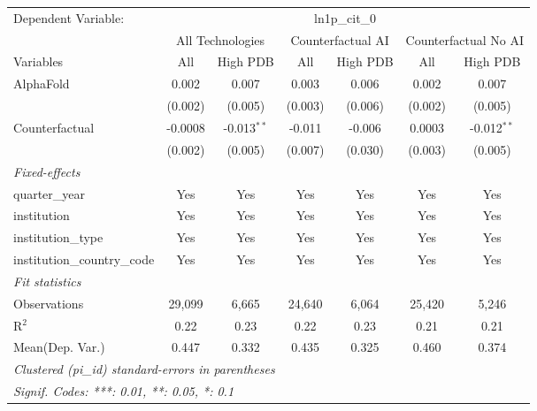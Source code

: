 \begingroup
\centering
\begin{tabular}{lcccccc}
   \tabularnewline \midrule \midrule
   Dependent Variable: & \multicolumn{6}{c}{ln1p\_cit\_0}\\
 & \multicolumn{2}{c}{All Technologies} & \multicolumn{2}{c}{Counterfactual AI} & \multicolumn{2}{c}{Counterfactual No AI} \\
\cmidrule(lr){1-1}\cmidrule(lr){2-3} \cmidrule(lr){4-5} \cmidrule(lr){6-7}
Variables & \multicolumn{1}{c}{All} & \multicolumn{1}{c}{High PDB} & \multicolumn{1}{c}{All} & \multicolumn{1}{c}{High PDB} & \multicolumn{1}{c}{All} & \multicolumn{1}{c}{High PDB} \\
\cmidrule(lr){1-1}\cmidrule(lr){2-2} \cmidrule(lr){3-3} \cmidrule(lr){4-4} \cmidrule(lr){5-5} \cmidrule(lr){6-6} \cmidrule(lr){7-7}
   AlphaFold                    & 0.002   & 0.007         & 0.003   & 0.006   & 0.002   & 0.007\\   
                                & (0.002) & (0.005)       & (0.003) & (0.006) & (0.002) & (0.005)\\   
   Counterfactual               & -0.0008 & -0.013$^{**}$ & -0.011  & -0.006  & 0.0003  & -0.012$^{**}$\\   
                                & (0.002) & (0.005)       & (0.007) & (0.030) & (0.003) & (0.005)\\   
   \midrule
   \emph{Fixed-effects}\\
   quarter\_year                & Yes     & Yes           & Yes     & Yes     & Yes     & Yes\\  
   institution                  & Yes     & Yes           & Yes     & Yes     & Yes     & Yes\\  
   institution\_type            & Yes     & Yes           & Yes     & Yes     & Yes     & Yes\\  
   institution\_country\_code   & Yes     & Yes           & Yes     & Yes     & Yes     & Yes\\  
   \midrule
   \emph{Fit statistics}\\
   Observations                 & 29,099  & 6,665         & 24,640  & 6,064   & 25,420  & 5,246\\  
   R$^2$                        & 0.22    & 0.23          & 0.22    & 0.23    & 0.21    & 0.21\\  
Mean(Dep. Var.) & 0.447 & 0.332 & 0.435 & 0.325 & 0.460 & 0.374 \\
   \midrule \midrule
   \multicolumn{7}{l}{\emph{Clustered (pi\_id) standard-errors in parentheses}}\\
   \multicolumn{7}{l}{\emph{Signif. Codes: ***: 0.01, **: 0.05, *: 0.1}}\\
\end{tabular}
\par\endgroup
